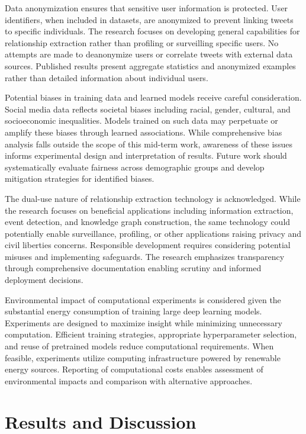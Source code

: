 \documentclass[12pt,a4paper]{report}
\begin{document}
Data anonymization ensures that sensitive user information is protected. User identifiers, when included in datasets, are anonymized to prevent linking tweets to specific individuals. The research focuses on developing general capabilities for relationship extraction rather than profiling or surveilling specific users. No attempts are made to deanonymize users or correlate tweets with external data sources. Published results present aggregate statistics and anonymized examples rather than detailed information about individual users.

Potential biases in training data and learned models receive careful consideration. Social media data reflects societal biases including racial, gender, cultural, and socioeconomic inequalities. Models trained on such data may perpetuate or amplify these biases through learned associations. While comprehensive bias analysis falls outside the scope of this mid-term work, awareness of these issues informs experimental design and interpretation of results. Future work should systematically evaluate fairness across demographic groups and develop mitigation strategies for identified biases.

The dual-use nature of relationship extraction technology is acknowledged. While the research focuses on beneficial applications including information extraction, event detection, and knowledge graph construction, the same technology could potentially enable surveillance, profiling, or other applications raising privacy and civil liberties concerns. Responsible development requires considering potential misuses and implementing safeguards. The research emphasizes transparency through comprehensive documentation enabling scrutiny and informed deployment decisions.

Environmental impact of computational experiments is considered given the substantial energy consumption of training large deep learning models. Experiments are designed to maximize insight while minimizing unnecessary computation. Efficient training strategies, appropriate hyperparameter selection, and reuse of pretrained models reduce computational requirements. When feasible, experiments utilize computing infrastructure powered by renewable energy sources. Reporting of computational costs enables assessment of environmental impacts and comparison with alternative approaches.

\chapter{Results and Discussion}
\end{document}
